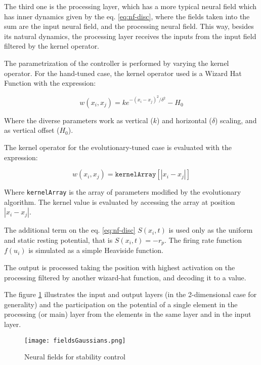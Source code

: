 The third one is the processing layer, which has a more typical neural
field which has inner dynamics given by the eq. \ref{eq:nf-disc},
where the fields taken into the sum are the input neural field, and
the processing neural field. This way, besides its natural dynamics,
the processing layer receives the inputs from the input field filtered
by the kernel operator.

The parametrization of the controller is performed by varying the
kernel operator. For the hand-tuned case, the kernel operator used is
a Wizard Hat Function with the expression:

\begin{equation}
  \label{eq:wizard-hat}
  w(x_i,x_j)=ke^{-(x_i-x_j)^2/\delta^2}-H_0
\end{equation}

Where the diverse parameters work as vertical ($k$) and horizontal
($\delta$) scaling, and as vertical offset ($H_0$).

The kernel operator for the evolutionary-tuned case is evaluated with
the expression:

\begin{equation}
  w(x_i,x_j)=\mathtt{kernelArray}[|x_i-x_j|]
\end{equation}

Where \texttt{kernelArray} is the array of parameters modified by the
evolutionary algorithm. The kernel value is evaluated by accessing the
array at position $|x_i-x_j|$.

The additional term on the eq. \ref{eq:nf-disc} $S(x_i,t)$ is used
only as the uniform and static resting potential, that is
$S(x_i,t)=-r_p$.  The firing rate function $f(u_i)$ is simulated as a
simple Heaviside function.

The output is processed taking the position with highest activation on
the processing filtered by another wizard-hat function, and decoding
it to a value.

The figure \ref{fig:nf-controller} illustrates the input and output
layers (in the 2-dimensional case for generality) and the
participation on the potential of a single element in the processing
(or main) layer from the elements in the same layer and in the input
layer.

\begin{figure}[t]
  \centering
  \texttt{[image: fieldsGaussians.png]}
  \caption{Neural fields for stability control}
  \label{fig:nf-controller}
\end{figure}


